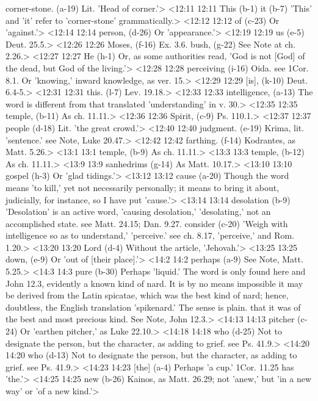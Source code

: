   corner-stone. (a-19)  Lit. 'Head of corner.'>
<12:11 12:11  This (b-1)  it (b-7)
  'This' and 'it' refer to 'corner-stone' grammatically.>
<12:12 12:12  of (c-23)  Or 'against.'>
<12:14 12:14  person, (d-26)  Or 'appearance.'>
<12:19 12:19  us (e-5)  Deut. 25.5.>
<12:26 12:26  Moses, (f-16)  Ex. 3.6.
  bush, (g-22)  See Note at ch. 2.26.>
<12:27 12:27  He (h-1)  Or, as some authorities read, 'God is not [God] of the dead,  but God of the living.'>
<12:28 12:28  perceiving (i-16)  Oida. see 1Cor. 8.1. Or 'knowing,' inward knowledge, as  ver. 15.>
<12:29 12:29  [is], (k-10)  Deut. 6.4-5.>
<12:31 12:31  this. (l-7)  Lev. 19.18.>
<12:33 12:33  intelligence, (a-13)  The word is different from that translated 'understanding' in  v. 30.>
<12:35 12:35  temple, (b-11) As ch. 11.11.>
<12:36 12:36  Spirit, (c-9)  Ps. 110.1.>
<12:37 12:37  people (d-18)  Lit. 'the great crowd.'>
<12:40 12:40  judgment. (e-19)  Krima, lit. 'sentence.' see Note, Luke 20.47.>
<12:42 12:42  farthing. (f-14)  Kodrantes, as Matt. 5.26.>
<13:1 13:1  temple, (b-9) As ch. 11.11.>
<13:3 13:3  temple, (b-12)  As ch. 11.11.>
<13:9 13:9  sanhedrims (g-14)  As Matt. 10.17.>
<13:10 13:10  gospel (h-3)  Or 'glad tidings.'>
<13:12 13:12  cause (a-20)  Though the word means 'to kill,' yet not necessarily  personally; it means to bring it about, judicially, for  instance, so I have put 'cause.'>
<13:14 13:14  desolation (b-9)  'Desolation' is an active word, 'causing desolation,'  'desolating,' not an accomplished state. see Matt. 24.15; Dan. 9.27.
  consider (c-20)  'Weigh with intelligence so as to understand,' 'perceive.'  see ch. 8.17, 'perceive,' and Rom. 1.20.>
<13:20 13:20  Lord (d-4)  Without the article, 'Jehovah.'>
<13:25 13:25  down, (e-9)  Or 'out of [their place].'>
<14:2 14:2  perhaps (a-9)  See Note, Matt. 5.25.>
<14:3 14:3  pure (b-30)  Perhaps 'liquid.' The word is only found here and John 12.3,  evidently a known kind of nard. It is by no means impossible it  may be derived from the Latin spicatae, which was the best  kind of nard; hence, doubtless, the English translation  'spikenard.' The sense is plain. that it was of the best and  most precious kind. See Note, John 12.3.>
<14:13 14:13  pitcher (c-24)  Or 'earthen pitcher,' as Luke 22.10.>
<14:18 14:18  who (d-25) Not to designate the person, but the character, as adding to grief. see Ps. 41.9.>
<14:20 14:20  who (d-13)  Not to designate the person, but the character, as adding to  grief. see Ps. 41.9.>
<14:23 14:23  [the] (a-4)  Perhaps 'a cup.' 1Cor. 11.25 has 'the.'>
<14:25 14:25  new (b-26)  Kainos, as Matt. 26.29; not 'anew,' but 'in a new way' or  'of a new kind.'>
